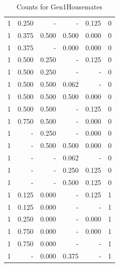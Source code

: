 \documentclass[a4paper]{article}\usepackage{graphicx, color}
\begin{document}
\begin{table}[ht]
\begin{tabular}{rrrrrr}
   \rowcolor{nullColor} 1 & 0.250 & - & - & 0.125 & 0 \\ 
   \rowcolor{goodColor} 1 & 0.375 & 0.500 & 0.500 & 0.000 & 0 \\ 
   \rowcolor{sosoColor} 1 & 0.375 & - & 0.000 & 0.000 & 0 \\ 
  1 & 0.500 & 0.250 & - & 0.125 & 0 \\ 
  1 & 0.500 & 0.250 & - & - & 0 \\ 
   \rowcolor{badColor} 1 & 0.500 & 0.500 & 0.062 & - & 0 \\ 
   \rowcolor{goodColor} 1 & 0.500 & 0.500 & 0.500 & 0.000 & 0 \\ 
  1 & 0.500 & 0.500 & - & 0.125 & 0 \\ 
  1 & 0.750 & 0.500 & - & 0.000 & 0 \\ 
  1 & - & 0.250 & - & 0.000 & 0 \\ 
   \rowcolor{goodColor} 1 & - & 0.500 & 0.500 & 0.000 & 0 \\ 
   \rowcolor{sosoColor} 1 & - & - & 0.062 & - & 0 \\ 
   \rowcolor{sosoColor} 1 & - & - & 0.250 & 0.125 & 0 \\ 
   \rowcolor{sosoColor} 1 & - & - & 0.500 & 0.125 & 0 \\ 
  1 & 0.125 & 0.000 & - & 0.125 & 1 \\ 
  1 & 0.125 & 0.000 & - & - & 1 \\ 
  1 & 0.250 & 0.000 & - & 0.000 & 1 \\ 
  1 & 0.750 & 0.000 & - & 0.000 & 1 \\ 
  1 & 0.750 & 0.000 & - & - & 1 \\ 
   \rowcolor{badColor} 1 & - & 0.000 & 0.375 & - & 1 \\ 
   \hline
\end{tabular}
\caption{Counts for Gen1Housemates} 
\end{table}
\end{document}
